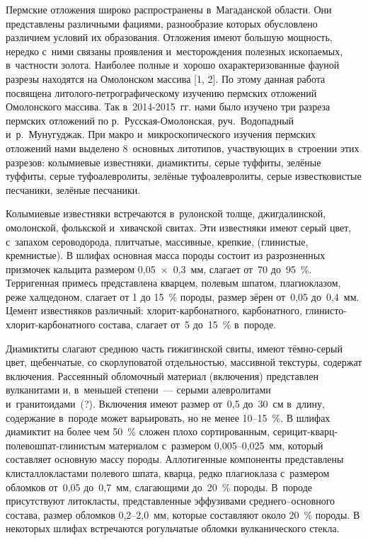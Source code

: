 




\makeProcTitleII
{}

Пермские отложения широко распространены в~Магаданской области. Они представлены различными фациями, разнообразие которых обусловлено различием условий их образования. Отложения имеют большую мощность, нередко с~ними связаны проявления и~месторождения полезных ископаемых, в~частности золота. Наиболее полные и~хорошо охарактеризованные фауной разрезы находятся на Омолонском массива [1, 2]. По этому данная работа посвящена литолого-петрографическому изучению пермских отложений Омолонского массива. Так в~2014-2015~гг. нами было изучено три разреза пермских отложений по р.~Русская-Омолонская, руч.~Водопадный и~р.~Мунугуджак. При макро и~микроскопического изучения пермских отложений нами выделено 8~основных литотипов, участвующих в~строении этих разрезов: колымиевые известняки, диамиктиты, серые туффиты, зелёные туффиты, серые туфоалевролиты, зелёные туфоалевролиты, серые известковистые песчаники, зелёные песчаники.

Колымиевые известняки встречаются в~рулонской толще, джигдалинской, омолонской, фолькской и~хивачской свитах. Эти известняки имеют серый цвет, с~запахом сероводорода, плитчатые, массивные, крепкие, (глинистые, кремнистые). В шлифах основная масса породы состоит из разрозненных призмочек кальцита размером 0,05~$\times$~0,3~мм, слагает от~70 до~95~\%. Терригенная примесь представлена кварцем, полевым шпатом, плагиоклазом, реже халцедоном, слагает от 1 до 15~\% породы, размер зёрен от~0,05 до~0,4~мм. Цемент известняков различный: хлорит-карбонатного, карбонатного, глинисто-хлорит-карбонатного состава, слагает от~5 до~15~\% в~породе.

Диамиктиты слагают среднюю часть гижигинской свиты, имеют тёмно-серый цвет, щебенчатые, со скорлуповатой отдельностью, массивной текстуры, содержат включения. Рассеянный обломочный материал (включения) представлен вулканитами и, в~меньшей степени~--- серыми алевролитами и~гранитоидами~(?). Включения имеют размер от~0,5 до~30~см в~длину, содержание в~породе может варьировать, но не менее 10--15~\%. В шлифах диамиктит на более чем 50~\% сложен плохо сортированным, серицит-кварц-полевошпат-глинистым материалом с~размером 0,005--0,025~мм, который составляет основную массу породы. Аллотигенные компоненты представлены клисталлокластами полевого шпата, кварца, редко плагиоклаза с~размером обломков от~0,05 до~0,7~мм, слагающими до~20~\% породы. В~породе присутствуют литокласты, представленные эффузивами среднего--основного состава, размер обломков 0,2--2,0~мм, которые составляют около 20~\% породы. В некоторых шлифах встречаются рогульчатые обломки вулканического стекла.

